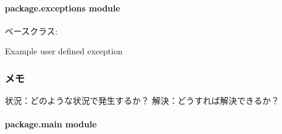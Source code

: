 \documentclass[letterpaper,10pt,dvipdfmx]{sphinxmanual}
\begin{document}
\begin{fulllineitems}
\label{\detokenize{package.constants:package.constants.print}}
\pysigstartsignatures
{}
\pysigstopsignatures
\end{fulllineitems}


\sphinxstepscope


\paragraph{package.exceptions module}
\label{\detokenize{package.exceptions:module-package.exceptions}}\label{\detokenize{package.exceptions:package-exceptions-module}}\label{\detokenize{package.exceptions::doc}}

\begin{fulllineitems}
\label{\detokenize{package.exceptions:package.exceptions.UserDefinedException}}
\pysigstartsignatures
{}
\pysigstopsignatures
\sphinxAtStartPar
ベースクラス: 

\sphinxAtStartPar
Example user defined exception
\subsubsection*{メモ}

\sphinxAtStartPar
状況：どのような状況で発生するか？
解決：どうすれば解決できるか？

\end{fulllineitems}


\sphinxstepscope


\paragraph{package.main module}
\label{\detokenize{package.main:module-package.main}}\label{\detokenize{package.main:package-main-module}}\label{\detokenize{package.main::doc}}
\end{document}

